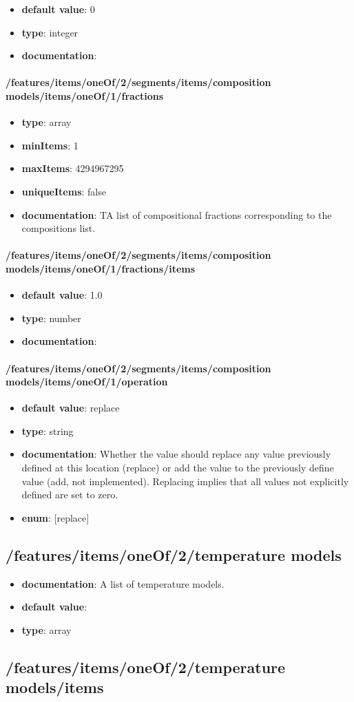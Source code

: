 \begin{itemize}\item {\bf default value}: 0
\item {\bf type}: integer
\item {\bf documentation}: 
\end{itemize}\paragraph{/features/items/oneOf/2/segments/items/composition models/items/oneOf/1/fractions}
\begin{itemize}\item {\bf type}: array
\item {\bf minItems}: 1
\item {\bf maxItems}: 4294967295
\item {\bf uniqueItems}: false
\item {\bf documentation}: TA list of compositional fractions corresponding to the compositions list.
\end{itemize}\paragraph{/features/items/oneOf/2/segments/items/composition models/items/oneOf/1/fractions/items}
\begin{itemize}\item {\bf default value}: 1.0
\item {\bf type}: number
\item {\bf documentation}: 
\end{itemize}\paragraph{/features/items/oneOf/2/segments/items/composition models/items/oneOf/1/operation}
\begin{itemize}\item {\bf default value}: replace
\item {\bf type}: string
\item {\bf documentation}: Whether the value should replace any value previously defined at this location (replace) or add the value to the previously define value (add, not implemented). Replacing implies that all values not explicitly defined are set to zero.
\item {\bf enum}: [replace]\end{itemize}\subsection{/features/items/oneOf/2/temperature models}
\begin{itemize}\item {\bf documentation}: A list of temperature models.
\item {\bf default value}: 
\item {\bf type}: array
\end{itemize}\subsection{/features/items/oneOf/2/temperature models/items}

